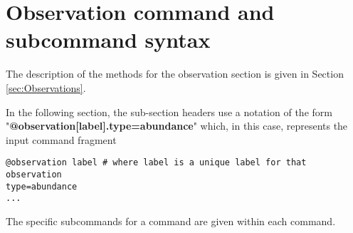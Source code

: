 \subsection{}


\subsection{}


\subsection{}


\subsection{}


\subsection{}


\subsection{}


\section{Observation command and subcommand syntax\label{syntax:Observations}}

The description of the methods for the observation section is given in Section \ref{sec:Observations}.

In the following section, the sub-section headers use a notation of the form "\textbf {@observation[label].type=abundance}" which, in this case, represents the input command fragment
{\small{\begin{verbatim}
@observation label # where label is a unique label for that observation
type=abundance
...
\end{verbatim}}}
The specific subcommands for a command are given within each command.

